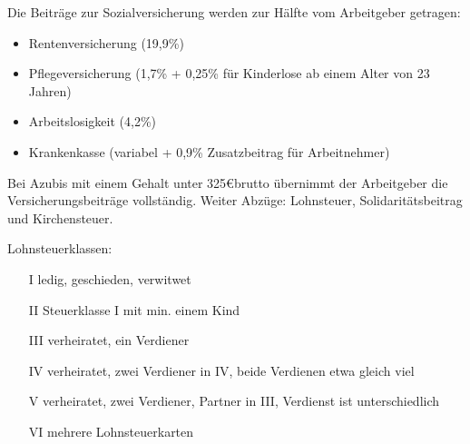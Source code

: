 Die Beiträge zur Sozialversicherung werden zur Hälfte vom Arbeitgeber getragen:
\begin{itemize}
	\item Rentenversicherung (19,9\%)
	\item Pflegeversicherung (1,7\% + 0,25\% für Kinderlose ab einem Alter von 23 Jahren)
	\item Arbeitslosigkeit (4,2\%)
	\item Krankenkasse (variabel + 0,9\% Zusatzbeitrag für Arbeitnehmer)
\end{itemize}
Bei Azubis mit einem Gehalt unter 325\euro brutto übernimmt der Arbeitgeber die Versicherungsbeiträge vollständig. Weiter Abzüge: Lohnsteuer, Solidaritätsbeitrag und Kirchensteuer.

Lohnsteuerklassen:
\begin{itemize}
	\item[I]		ledig, geschieden, verwitwet
	\item[II]	Steuerklasse I mit min. einem Kind
	\item[III]	verheiratet, ein Verdiener
	\item[IV]	verheiratet, zwei Verdiener in IV, beide Verdienen etwa gleich viel
	\item[V]		verheiratet, zwei Verdiener, Partner in III, Verdienst ist unterschiedlich
	\item[VI]	mehrere Lohnsteuerkarten
\end{itemize}


